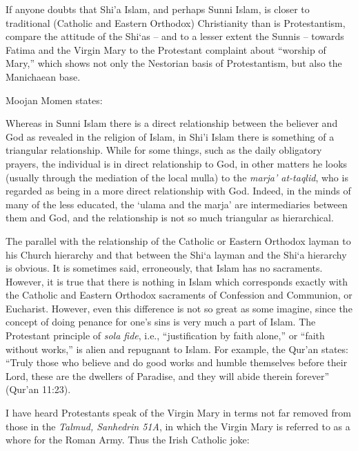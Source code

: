 If anyone doubts that Shi'a Islam, and perhaps Sunni Islam, is closer to traditional (Catholic and Eastern Orthodox) Christianity than is Protestantism, compare the attitude of the Shi`as -- and to a lesser extent the Sunnis -- towards Fatima and the Virgin Mary to the Protestant complaint about ``worship of Mary,'' which shows not only the Nestorian basis of Protestantism, but also the Manichaean base.

Moojan Momen states:

\begin{quotex}
Whereas in Sunni Islam there is a direct relationship between the believer and God as revealed in the religion of Islam, in Shi'i Islam there is something of a triangular relationship. While for some things, such as the daily obligatory prayers, the individual is in direct relationship to God, in other matters he looks (usually through the mediation of the local mulla) to the \emph{marja' at-taqlid}, who is regarded as being in a more direct relationship with God. Indeed, in the minds of many of the less educated, the `ulama and the marja' are intermediaries between them and God, and the relationship is not so much triangular as hierarchical.
\end{quotex}


The parallel with the relationship of the Catholic or Eastern Orthodox layman to his Church hierarchy and that between the Shi`a layman and the Shi`a hierarchy is obvious. It is sometimes said, erroneously, that Islam has no sacraments. However, it is true that there is nothing in Islam which corresponds exactly with the Catholic and Eastern Orthodox sacraments of Confession and Communion, or Eucharist. However, even this difference is not so great as some imagine, since the concept of doing penance for one's sins is very much a part of Islam. The Protestant principle of \emph{sola fide}, i.e., ``justification by faith alone,'' or ``faith without works,'' is alien and repugnant to Islam. For example, the Qur'an states: ``Truly those who believe and do good works and humble themselves before their Lord, these are the dwellers of Paradise, and they will abide therein forever'' (Qur'an 11:23).

I have heard Protestants speak of the Virgin Mary in terms not far removed from those in the \emph{Talmud, Sanhedrin 51A}, in which the Virgin Mary is referred to as a whore for the Roman Army. Thus the Irish Catholic joke:

